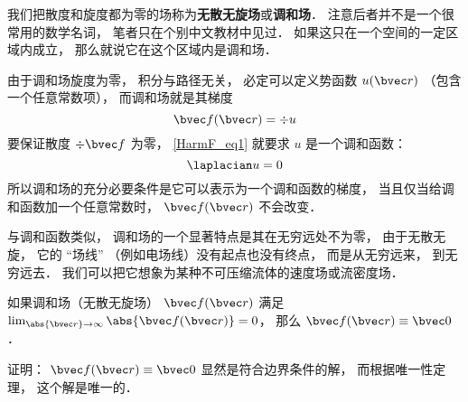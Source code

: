 
\begin{issues}
\issueDraft
\end{issues}


我们把散度和旋度都为零的场称为\textbf{无散无旋场}或\textbf{调和场}． 注意后者并不是一个很常用的数学名词， 笔者只在个别中文教材中见过． 如果这只在一个空间的一定区域内成立， 那么就说它在这个区域内是调和场．

由于调和场旋度为零， 积分与路径无关， 必定可以定义势函数 $u(\bvec r)$ （包含一个任意常数项）， 而调和场就是其梯度
\begin{equation}\label{HarmF_eq1}
\bvec f(\bvec r) = \div u
\end{equation}
要保证散度 $\div \bvec f$ 为零， \autoref{HarmF_eq1} 就要求 $u$ 是一个调和函数：
\begin{equation}
\laplacian u = 0
\end{equation}
所以调和场的充分必要条件是它可以表示为一个调和函数的梯度， 当且仅当给调和函数加一个任意常数时， $\bvec f(\bvec r)$ 不会改变．

与调和函数类似， 调和场的一个显著特点是其在无穷远处不为零， 由于无散无旋， 它的 “场线” （例如电场线）没有起点也没有终点， 而是从无穷远来， 到无穷远去． 我们可以把它想象为某种不可压缩流体的速度场或流密度场．

\begin{theorem}{}\label{HarmF_the1}
如果调和场（无散无旋场） $\bvec f(\bvec r)$ 满足 $\lim_{\abs{\bvec r}\to \infty} \abs{\bvec f(\bvec r)}  = 0$， 那么 $\bvec f(\bvec r) \equiv \bvec 0$．
\end{theorem}
证明： $\bvec f(\bvec r) \equiv \bvec 0$ 显然是符合边界条件的解， 而根据唯一性定理， 这个解是唯一的．
